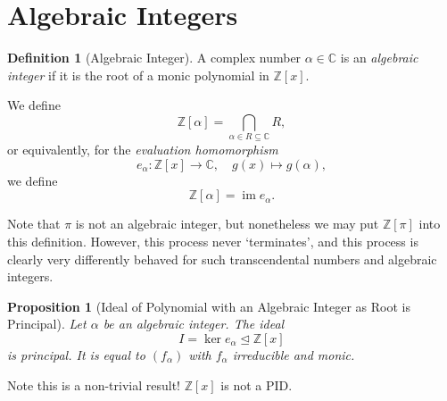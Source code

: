 \documentclass{article}
\newtheorem{proposition}[theorem]{Proposition}
\theoremstyle{definition}
\newtheorem{definition}[theorem]{Definition}
\theoremstyle{remark}
\newcommand{\pqty}[1]{\left(#1\right)}
\newcommand{\bqty}[1]{\left[#1\right]}
\newcommand{\function}[5]{#1:#2\to #3,\quad #4\mapsto #5}
\newcommand{\subring}{\subseteq}
\newcommand{\idealsub}{\trianglelefteq}
\newcommand{\ZZ}{\mathbb{Z}}
\newcommand{\CC}{\mathbb{C}}
\newcommand{\img}{\operatorname{im}}
\begin{document}
\section{Algebraic Integers}

\begin{definition}[Algebraic Integer]
    \label{def:algebraic-integer}%
    A complex number \(\alpha \in \CC\) is an \emph{algebraic integer} if it is the root of a monic polynomial in \(\ZZ\bqty{x}\).

    We define
    \[
        \ZZ\bqty{\alpha} = \bigcap_{\alpha \in R \subring \CC} R,
    \]
    or equivalently, for the \emph{evaluation homomorphism}
    \[
        \function{e_\alpha}{\ZZ\bqty{x}}{\CC}{g\pqty{x}}{g\pqty{\alpha},}
    \]
    we define
    \[
        \ZZ\bqty{\alpha} = \img e_{\alpha}.
    \]
\end{definition}

Note that \(\pi\) is not an algebraic integer, but nonetheless we may put \(\ZZ\bqty{\pi}\) into this definition. However, this process never `terminates', and this process is clearly very differently behaved for such transcendental numbers and algebraic integers.

\begin{proposition}[Ideal of Polynomial with an Algebraic Integer as Root is Principal]
    \label{prop:ideal-polynomial-algebraic-integer-principal}%
    Let \(\alpha\) be an algebraic integer. The ideal
    \[
        I = \ker e_{\alpha} \idealsub \ZZ\bqty{x}
    \]
    is \emph{principal}. It is equal to \(\pqty{f_\alpha}\) with \(f_\alpha\) irreducible and monic.
\end{proposition}

Note this is a non-trivial result! \(\ZZ\bqty{x}\) is not a PID.
\end{document}
